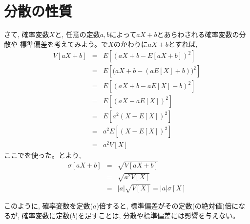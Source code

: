 \section{分散の性質}
さて, 確率変数$X$と, 任意の定数$a, b$によって$aX+b$とあらわされる確率変数の分散や
標準偏差を考えてみよう。で$X$のかわりに$aX+b$とすれば, 
\begin{eqnarray}
V[aX+b]&=&E[(aX+b-E[aX+b])^2]\nonumber\\
       &=&E[\bigl(aX+b-(aE[X]+b)\bigr)^2]\nonumber\\
       &=&E[(aX+b-aE[X]-b)^2]\nonumber\\
       &=&E[(aX-aE[X])^2]\nonumber\\
       &=&E[a^2(X-E[X])^2]\nonumber\\
       &=&a^2E[(X-E[X])^2]\nonumber\\
       &=&a^2V[X]\label{eq:variance_trans_ab}
\end{eqnarray}
ここでを使った。とより, 
\begin{eqnarray}
\sigma[aX+b]&=&\sqrt{V[aX+b]}\nonumber\\
             &=&\sqrt{a^2V[X]}\nonumber\\
            &=&|a|\sqrt{V[X]}=|a|\sigma[X]\label{eq:std_trans_ab}
\end{eqnarray}

このように, 確率変数を定数($a$)倍すると, 標準偏差がその定数(の絶対値)倍になるが,  
確率変数に定数($b$)を足すことは, 分散や標準偏差には影響を与えない。\\

